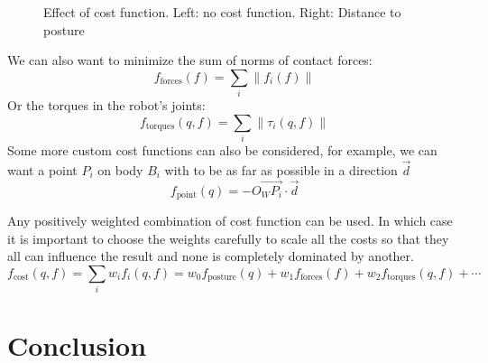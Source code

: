 \begin{figure}[htpb]
  \centering
  \setlength{\fboxsep}{0pt}%
  \setlength{\fboxrule}{1pt}%
  \caption{Effect of cost function. Left: no cost function. Right: Distance to posture}
\label{fig:cost}
\end{figure}

We can also want to minimize the sum of norms of contact forces:
\begin{equation*}
  f_\text{forces}(f) = \sum\limits_i \|f_i(f)\|
\end{equation*}
Or the torques in the robot's joints:
\begin{equation*}
  f_\text{torques}(q,f) = \sum\limits_i \|\tau_i(q,f)\|
\end{equation*}
Some more custom cost functions can also be considered, for example, we can want a point $P_i$ on body $B_i$ with to be as far as possible in a direction $\vec{d}$
\begin{equation*}
  f_\text{point} (q) = -{\overrightarrow{O_W P_i}}\cdot{\vec{d}}
\end{equation*}

Any positively weighted combination of cost function can be used. In which case it is important to choose the weights carefully to scale all the costs so that they all can influence the result and none is completely dominated by another.
\begin{equation}
  f_\text{cost}(q,f) = \sum\limits_i{w_i f_i(q,f)} = w_0 f_\text{posture}(q) + w_1 f_\text{forces}(f) + w_2 f_\text{torques}(q,f) + \cdots
\end{equation}



\section{Conclusion}
\label{sec:Ch1_Conclusion}


